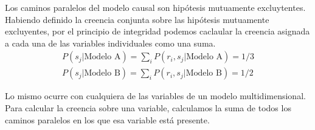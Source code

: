 \documentclass[a4paper,10pt]{book}
\theoremstyle{definition}
\begin{document}

Los caminos paralelos del modelo causal son hipótesis mutuamente excluytentes.
%
% 
% 
Habiendo definido la creencia conjunta sobre las hipótesis mutuamente excluyentes, por el principio de integridad podemos caclaular la creencia asignada a cada una de las variables individuales como una suma.
%
\begin{equation}
\begin{split}
P(s_j|\text{Modelo A}) = \sum_i P(r_i, s_j|\text{Modelo A}) = 1/3 \\  P(s_j|\text{Modelo B}) = \sum_i P(r_i, s_j|\text{Modelo B}) = 1/2
\end{split}
\end{equation}


Lo mismo ocurre con cualquiera de las variables de un modelo multidimensional.
Para calcular la creencia sobre una variable, calculamos la suma de todos los caminos paralelos en los que esa variable está presente.
\end{document}
